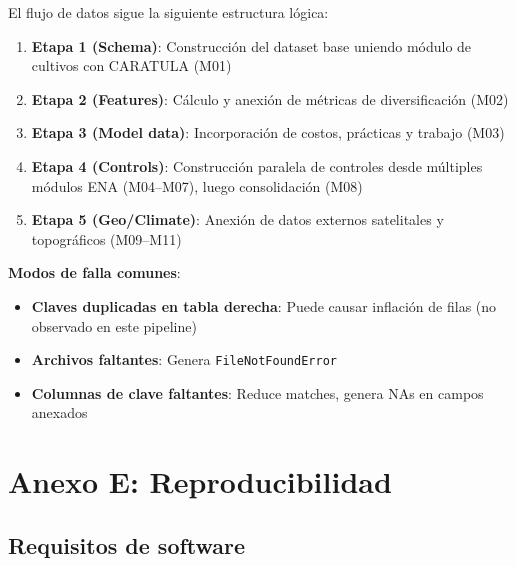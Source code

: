 \documentclass[11pt,a4paper]{article}
\begin{document}
El flujo de datos sigue la siguiente estructura lógica:

\begin{enumerate}
    \item \textbf{Etapa 1 (Schema)}: Construcción del dataset base uniendo módulo de cultivos con CARATULA (M01)
    \item \textbf{Etapa 2 (Features)}: Cálculo y anexión de métricas de diversificación (M02)
    \item \textbf{Etapa 3 (Model data)}: Incorporación de costos, prácticas y trabajo (M03)
    \item \textbf{Etapa 4 (Controls)}: Construcción paralela de controles desde múltiples módulos ENA (M04--M07), luego consolidación (M08)
    \item \textbf{Etapa 5 (Geo/Climate)}: Anexión de datos externos satelitales y topográficos (M09--M11)
\end{enumerate}

\textbf{Modos de falla comunes}:
\begin{itemize}
    \item \textbf{Claves duplicadas en tabla derecha}: Puede causar inflación de filas (no observado en este pipeline)
    \item \textbf{Archivos faltantes}: Genera \texttt{FileNotFoundError}
    \item \textbf{Columnas de clave faltantes}: Reduce matches, genera NAs en campos anexados
\end{itemize}

\section{Anexo E: Reproducibilidad}

\subsection{Requisitos de software}
\end{document}
